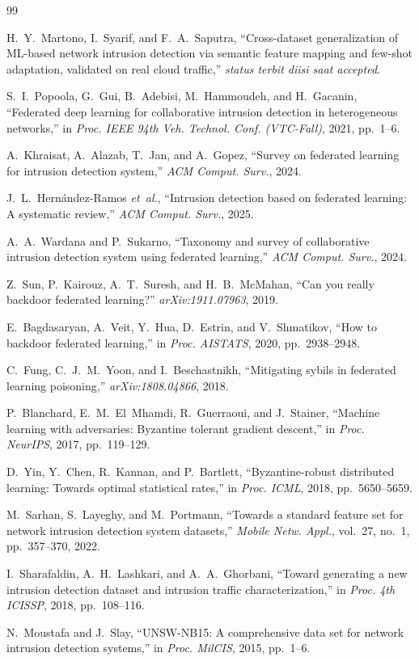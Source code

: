\documentclass[11pt,a4paper]{article}
\begin{document}
\begin{thebibliography}{99}

 H.~Y.~Martono, I.~Syarif, and F.~A.~Saputra, ``Cross-dataset
generalization of ML-based network intrusion detection via semantic feature
mapping and few-shot adaptation, validated on real cloud traffic,'' \emph{status
terbit diisi saat accepted}.

 S.~I.~Popoola, G.~Gui, B.~Adebisi, M.~Hammoudeh, and
H.~Gacanin, ``Federated deep learning for collaborative intrusion detection in
heterogeneous networks,'' in \emph{Proc. IEEE 94th Veh. Technol. Conf.
(VTC-Fall)}, 2021, pp.~1--6.

 A.~Khraisat, A.~Alazab, T.~Jan, and A.~Gopez, ``Survey on
federated learning for intrusion detection system,'' \emph{ACM Comput. Surv.},
2024.

 J.~L.~Hern\'andez-Ramos \emph{et~al.}, ``Intrusion detection
based on federated learning: A systematic review,'' \emph{ACM Comput. Surv.}, 2025.

 A.~A.~Wardana and P.~Sukarno, ``Taxonomy and survey of
collaborative intrusion detection system using federated learning,'' \emph{ACM
Comput. Surv.}, 2024.

 Z.~Sun, P.~Kairouz, A.~T.~Suresh, and H.~B.~McMahan, ``Can you
really backdoor federated learning?'' \emph{arXiv:1911.07963}, 2019.

 E.~Bagdasaryan, A.~Veit, Y.~Hua, D.~Estrin, and
V.~Shmatikov, ``How to backdoor federated learning,'' in \emph{Proc. AISTATS},
2020, pp.~2938--2948.

 C.~Fung, C.~J.~M.~Yoon, and I.~Beschastnikh, ``Mitigating sybils
in federated learning poisoning,'' \emph{arXiv:1808.04866}, 2018.

 P.~Blanchard, E.~M.~El~Mhamdi, R.~Guerraoui, and J.~Stainer,
``Machine learning with adversaries: Byzantine tolerant gradient descent,'' in
\emph{Proc. NeurIPS}, 2017, pp.~119--129.

 D.~Yin, Y.~Chen, R.~Kannan, and P.~Bartlett, ``Byzantine-robust
distributed learning: Towards optimal statistical rates,'' in \emph{Proc. ICML},
2018, pp.~5650--5659.

 M.~Sarhan, S.~Layeghy, and M.~Portmann, ``Towards a standard
feature set for network intrusion detection system datasets,'' \emph{Mobile Netw.
Appl.}, vol.~27, no.~1, pp.~357--370, 2022.

 I.~Sharafaldin, A.~H.~Lashkari, and A.~A.~Ghorbani, ``Toward
generating a new intrusion detection dataset and intrusion traffic
characterization,'' in \emph{Proc. 4th ICISSP}, 2018, pp.~108--116.

 N.~Moustafa and J.~Slay, ``UNSW-NB15: A comprehensive data set for
network intrusion detection systems,'' in \emph{Proc. MilCIS}, 2015, pp.~1--6.

\end{thebibliography}
\end{document}
